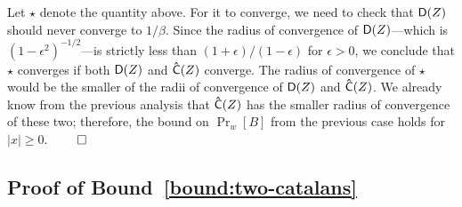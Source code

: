   Let $\star$ denote the quantity above. 
  For it to converge, 
  we need to check that $\mathsf{D}(Z)$
  should never converge to $1/\beta$.  
  Since the radius of convergence of $\mathsf{D}(Z)$---which is
  $(1-\epsilon^2)^{-1/2}$---is strictly less than 
  $(1+\epsilon)/(1-\epsilon)$ for $\epsilon > 0$, 
  we conclude that $\star$ converges if
  both $\mathsf{D}(Z)$ and $\mathsf{\hat{C}}(Z)$ converge.  The radius of
  convergence of $\star$ would be the smaller of the radii
  of convergence of $\mathsf{D}(Z)$ and $\mathsf{\hat{C}}(Z)$.  We already
  know from the previous analysis that $\mathsf{\hat{C}}(Z)$ has the
  smaller radius of convergence of these two; 
  therefore, the bound
  on $\Pr_w[B]$ from the previous case holds for $|x| \geq 0$. 
  \hfill$\qed$




\subsection{Proof of Bound~\ref{bound:two-catalans}}
  

  



